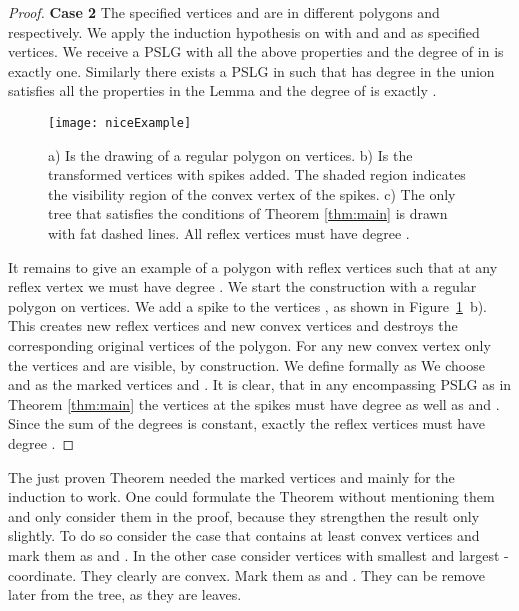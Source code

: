 \documentclass[12pt]{article}
\begin{document}
\begin{proof}
	\textbf{Case 2} The specified vertices  and  are in different polygons  and  respectively. We apply the induction hypothesis on  with  and   and  as specified vertices. We receive a PSLG  with all the above properties and the degree of  in  is exactly one. Similarly there exists a PSLG  in  such that  has degree  in  the union   satisfies all the properties in the Lemma and the degree of  is exactly .
				\begin{figure}[h]
			\begin{center}
			\texttt{[image: niceExample]}
				\caption{a) Is the drawing of a regular polygon on  vertices. b) Is the transformed vertices with  spikes added. The shaded region indicates the visibility region of the convex vertex of the spikes. c) The only tree that satisfies the conditions of Theorem \ref{thm:main} is drawn with fat dashed lines. All reflex vertices must have degree .}
				\label{fig:tightExample}
			\end{center}
	\end{figure} 
	It remains to give an example of a polygon with  reflex vertices such that at any reflex vertex we must have degree . We start the construction with a regular polygon on  vertices. We add a spike to the vertices , as shown in Figure~\ref{fig:tightExample}~b).
	This creates new reflex vertices  and new convex vertices  and destroys the corresponding original vertices of the polygon. For any new convex vertex  only the vertices  and  are visible, by construction. We define  formally as 
	 We choose   and  as the marked vertices  and . It is clear, that in any encompassing PSLG as in Theorem \ref{thm:main} the vertices at the spikes must have degree  as well as  and . Since the sum of the degrees is constant, exactly the reflex vertices must have degree .
\end{proof}

The just proven Theorem needed the marked vertices  and  mainly for the induction to work. One could formulate the Theorem without mentioning them and only consider them in the proof, because they strengthen the result only slightly. 
To do so consider the case that  contains at least  convex vertices and mark them as  and . In the other case consider
vertices with smallest and largest -coordinate.  They clearly are convex. Mark them as  and . They can be remove later from the tree, as they are leaves.
\end{document}
